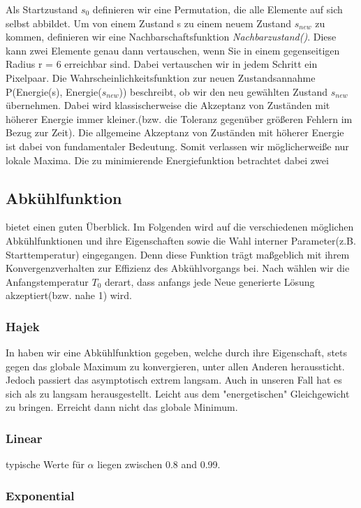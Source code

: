 Als Startzustand $s_{0}$ definieren wir eine Permutation, die alle 
Elemente auf sich selbst abbildet.
Um von einem Zustand s zu einem neuem Zustand $s_{new}$ zu kommen,
definieren wir eine Nachbarschaftsfunktion \textit{Nachbarzustand()}. 
Diese kann zwei Elemente genau dann vertauschen, wenn Sie in einem 
gegenseitigen Radius r = 6 erreichbar sind. Dabei vertauschen wir
in jedem Schritt ein Pixelpaar. 
Die Wahrscheinlichkeitsfunktion zur neuen Zustandsannahme
P(Energie(s), Energie($s_{new}$)) beschreibt, ob wir den neu
gewählten Zustand $s_{new}$ übernehmen. Dabei wird klassischerweise die
Akzeptanz von Zuständen mit höherer Energie immer kleiner.(bzw. die 
Toleranz gegenüber größeren Fehlern im Bezug zur Zeit). Die allgemeine Akzeptanz von 
Zuständen mit höherer Energie ist dabei von fundamentaler Bedeutung.
Somit verlassen wir möglicherweiße nur lokale Maxima.
Die zu minimierende Energiefunktion  betrachtet
dabei zwei 

\subsection{Abkühlfunktion}
\cite{coolDownOverview} bietet einen guten Überblick.
Im Folgenden wird auf die verschiedenen möglichen Abkühlfunktionen und ihre Eigenschaften
sowie die Wahl interner Parameter(z.B. Starttemperatur) eingegangen. Denn diese Funktion
trägt maßgeblich mit ihrem Konvergenzverhalten zur Effizienz des Abkühlvorgangs bei.
Nach \cite{Kirkpatrick671} wählen wir die Anfangstemperatur $T_0$ derart, dass anfangs jede Neue generierte Lösung akzeptiert(bzw. nahe 1) wird.
\subsubsection{Hajek}
In \cite{hajek1988cooling} haben wir eine Abkühlfunktion gegeben, welche durch ihre Eigenschaft,
stets gegen das globale Maximum zu konvergieren, unter allen Anderen heraussticht.
Jedoch passiert das asymptotisch extrem langsam. Auch in unseren Fall hat 
es sich als zu langsam herausgestellt.
Leicht aus dem "energetischen" Gleichgewicht zu bringen. Erreicht dann nicht 
das globale Minimum.

\subsubsection{Linear}
\cite{Kirkpatrick671}
typische Werte für $\alpha$ liegen zwischen 0.8 and 0.99.

\subsubsection{Exponential}
\cite{Kirkpatrick671}

